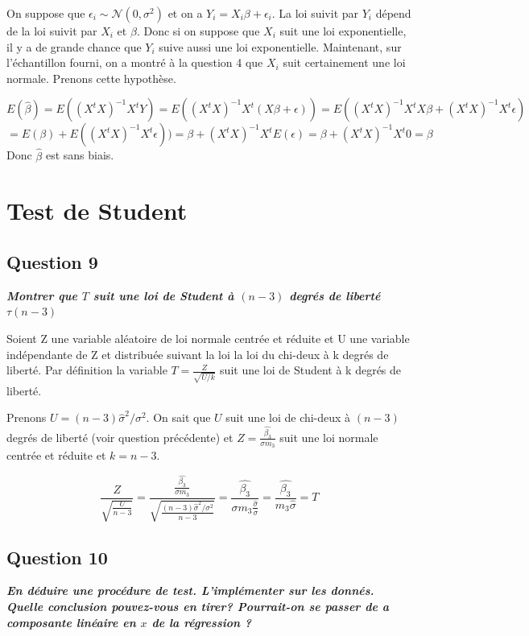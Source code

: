 \documentclass[pdflatex]{article}
\theoremstyle{definition}
\newcommand{\quest}[1]{\textbf{\textit{#1}} \vspace{3mm}}
\begin{document}
On suppose que $\epsilon_i \sim \mathscr{N}(0,\sigma^2)$ et on a $Y_i = X_i\beta + \epsilon_i$. La loi suivit par $Y_i$ d\'epend de la loi suivit par $X_i$ et $\beta$. Donc si on suppose que $X_i$ suit une loi exponentielle, il y a de grande chance que $Y_i$ suive aussi une loi exponentielle.
Maintenant, sur l'\'echantillon fourni, on a montr\'e \`a la question 4 que $X_i$ suit certainement une loi normale.
Prenons cette hypoth\`ese.



$$E(\hat{\beta}) = E((X^tX)^{-1}X^tY) = E((X^tX)^{-1}X^t(X\beta + \epsilon)) = E((X^tX)^{-1}X^tX\beta+ (X^tX)^{-1}X^t\epsilon)
$$
$$
= E(\beta)+ E((X^tX)^{-1}X^t\epsilon)) = \beta + (X^tX)^{-1}X^tE(\epsilon) = \beta + (X^tX)^{-1}X^t0 = \beta
$$
Donc $\hat{\beta}$ est sans biais.

\section*{Test de Student}

\subsection*{Question 9}
\quest{Montrer que $T$ suit une loi de Student \`a $(n - 3)$ degr\'es de libert\'e $\tau (n - 3)$}

Soient Z une variable al\'eatoire de loi normale centr\'ee et r\'eduite et U une variable ind\'ependante de Z et distribu\'ee suivant la loi la loi du chi-deux \`a k degr\'es de libert\'e. Par d\'efinition la variable $T=\frac {Z}{\sqrt {U/k}}$ suit une loi de Student \`a k degr\'es de libert\'e.

Prenons $U = (n-3)\hat{\sigma}^2/\sigma^2$. On sait que $U$ suit une loi de chi-deux \`a $(n-3)$ degr\'es de libert\'e (voir question pr\'ec\'edente) et $Z = \frac{\hat{\beta_3}}{\sigma m_3}$ suit une loi normale centr\'ee et r\'eduite et $k = n-3$.

$$
\frac{Z}{\sqrt{\frac{U}{n-3}}} = \frac{\frac{\hat{\beta_3}}{\sigma m_3}}{\sqrt{\frac{(n-3)\hat{\sigma}^2/\sigma^2}{n-3}}}
= \frac{\hat{\beta_3}}{\sigma m_3 \frac{\hat{\sigma}}{\sigma}} 
= \frac{\hat{\beta_3}}{m_3 \hat{\sigma}} = T
$$


\subsection*{Question 10}
\quest{En d\'eduire une proc\'edure de test. L'impl\'ementer sur les donn\'es. Quelle conclusion pouvez-vous en tirer? Pourrait-on se passer de a composante lin\'eaire en $x$ de la r\'egression ?}
\end{document}

